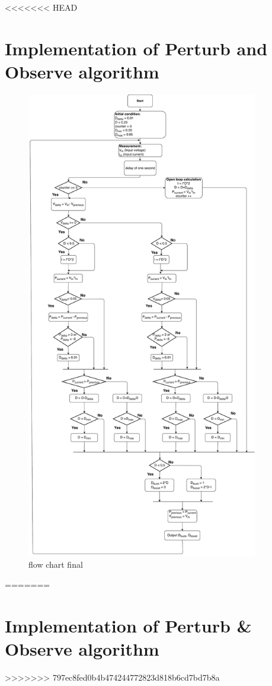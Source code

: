 <<<<<<< HEAD
\section{Implementation of Perturb and Observe algorithm}\label{MPPTImplementation}

\begin{figure}[htbp]
	\begin{center}
		\includegraphics[width=0.9\textwidth]{../Pictures/2018_11_14_Flow_chart_MPPT_Buck-Boost_converter}
		\caption{flow chart final }
		\label{fcfinal}
	\end{center}	
\end{figure}

=======
\section{Implementation of Perturb & Observe algorithm}\label{MPPTImplementation}
>>>>>>> 797ec8fed0b4b474244772823d818b6cd7bd7b8a
